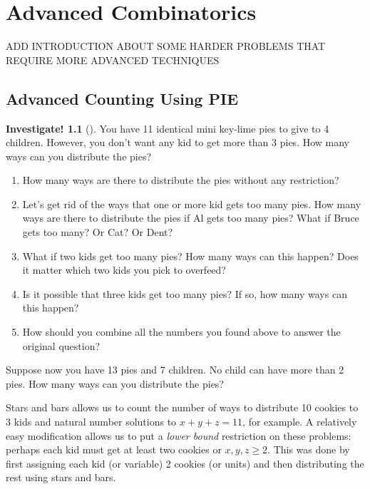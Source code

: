 \documentclass[10pt,]{book}
\theoremstyle{plain}
\theoremstyle{definition}
\theoremstyle{definition}
\theoremstyle{definition}
\newtheorem{investigation}[project]{Investigate!}
\theoremstyle{definition}
\numberwithin{equation}{chapter}
\begin{document}
\chapter[{Advanced Combinatorics}]{Advanced Combinatorics}\label{ch_advanced}
\hypertarget{p-830}{}%
ADD INTRODUCTION ABOUT SOME HARDER PROBLEMS THAT REQUIRE MORE ADVANCED TECHNIQUES%
\typeout{************************************************}
\typeout{************************************************}
\section[{Advanced Counting Using PIE}]{Advanced Counting Using PIE}\label{sec_advPIE}
\begin{investigation}[]\label{investigation-7}
\hypertarget{p-831}{}%
You have 11 identical mini key-lime pies to give to 4 children. However, you don't want any kid to get more than 3 pies. How many ways can you distribute the pies? %
\begin{enumerate}
\item\hypertarget{li-118}{}\hypertarget{p-832}{}%
How many ways are there to distribute the pies without any restriction?%
\item\hypertarget{li-119}{}\hypertarget{p-833}{}%
Let's get rid of the ways that one or more kid gets too many pies. How many ways are there to distribute the pies if Al gets too many pies? What if Bruce gets too many? Or Cat? Or Dent?%
\item\hypertarget{li-120}{}\hypertarget{p-834}{}%
What if two kids get too many pies? How many ways can this happen? Does it matter which two kids you pick to overfeed?%
\item\hypertarget{li-121}{}\hypertarget{p-835}{}%
Is it possible that three kids get too many pies? If so, how many ways can this happen?%
\item\hypertarget{li-122}{}\hypertarget{p-836}{}%
How should you combine all the numbers you found above to answer the original question?%
\end{enumerate}
%
\par
\hypertarget{p-837}{}%
Suppose now you have 13 pies and 7 children. No child can have more than 2 pies. How many ways can you distribute the pies?%
\end{investigation}
\hypertarget{p-838}{}%
Stars and bars allows us to count the number of ways to distribute 10 cookies to 3 kids and natural number solutions to \(x+y+z = 11\), for example. A relatively easy modification allows us to put a \emph{lower bound} restriction on these problems: perhaps each kid must get at least two cookies or \(x,y,z \ge 2\). This was done by first assigning each kid (or variable) 2 cookies (or units) and then distributing the rest using stars and bars.%
\end{document}

